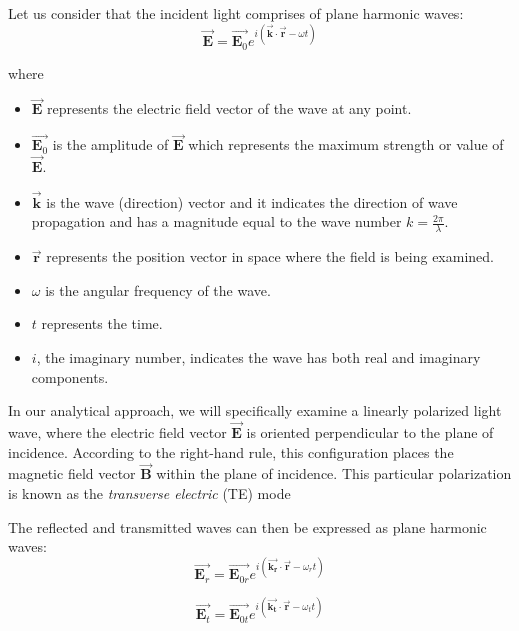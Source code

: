 Let us consider that the incident light comprises of plane harmonic waves:
\begin{equation} \label{Plane harmonic wave equation - incident}
\vec{\mathbf{E}} = \vec{\mathbf{E}_0} e^{i(\vec{\mathbf{k}} \cdot \vec{\mathbf{r}} - \omega t)}
\end{equation}

where 
\begin{itemize}
    \item $\vec{\mathbf{E}}$ represents the electric field vector of the wave at any point.
    \item $\vec{\mathbf{E}_0}$ is the amplitude of $\vec{\mathbf{E}}$ which represents the maximum strength or value of $\vec{\mathbf{E}}$.
    \item $\vec{\mathbf{k}}$ is the wave (direction) vector and it indicates the direction of wave propagation and has a magnitude equal to the wave number $k=\frac{2\pi}{\lambda}$.
    \item $\vec{\mathbf{r}}$ represents the position vector in space where the field is being examined.
    \item $\omega$ is the angular frequency of the wave.
    \item $t$ represents the time.
    \item $i$, the imaginary number, indicates the wave has both real and imaginary components.
\end{itemize}

In our analytical approach, we will specifically examine a linearly polarized light wave, where the electric field vector $\vec{\mathbf{E}}$ is oriented perpendicular to the plane of incidence. According to the right-hand rule, this configuration places the magnetic field vector $\vec{\mathbf{B}}$ within the plane of incidence. This particular polarization is known as the \textit{transverse electric} (TE) mode

The reflected and transmitted waves can then be expressed as plane harmonic waves:
\begin{equation} \label{Plane harmonic wave equation - reflected}
\vec{\mathbf{E}_r} = \vec{\mathbf{E}_{0r}} e^{i(\vec{\mathbf{k_r}} \cdot \vec{\mathbf{r}} - \omega_r t)}
\end{equation}

\begin{equation} \label{Plane harmonic wave equation - refracted}
\vec{\mathbf{E}_t} = \vec{\mathbf{E}_{0t}} e^{i(\vec{\mathbf{k_t}} \cdot \vec{\mathbf{r}} - \omega_t t)}
\end{equation}

